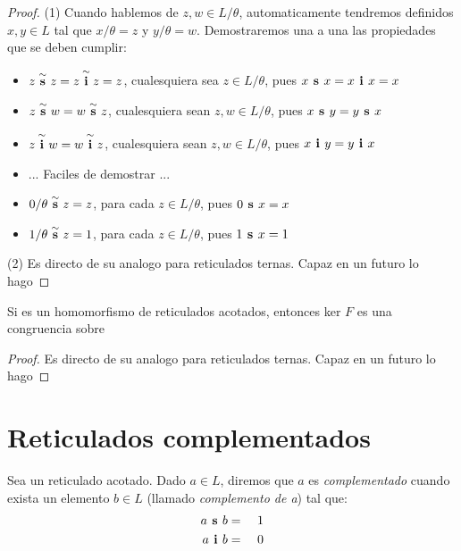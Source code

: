   \begin{proof}
    (1) Cuando hablemos de $z, w \in L/\theta$, automaticamente tendremos definidos $x, y \in L$ tal que $x/\theta = z$ y $y/\theta = w$. Demostraremos una a una las propiedades que se deben cumplir:
    \begin{itemize}
      \item $z\overset{\sim}{\textbf{ s }}z = z\overset{\sim}{\textbf{ i }}z = z$, cualesquiera sea $z \in L/\theta$, pues $x\textbf{ s }x = x\textbf{ i }x = x$
      \item $z\overset{\sim}{\textbf{ s }}w = w\overset{\sim}{\textbf{ s }}z$, cualesquiera sean $z, w \in L/\theta$, pues $x\textbf{ s }y = y\textbf{ s }x$
      \item $z\overset{\sim}{\textbf{ i }}w = w\overset{\sim}{\textbf{ i }}z$, cualesquiera sean $z, w \in L/\theta$, pues $x\textbf{ i }y = y\textbf{ i }x$
      \item ... Faciles de demostrar ...
      \item $0/\theta\overset{\sim}{\textbf{ s }}z = z$, para cada $z \in L/\theta$, pues $0\textbf{ s }x = x$
      \item $1/\theta\overset{\sim}{\textbf{ s }}z = 1$, para cada $z \in L/\theta$, pues $1\textbf{ s }x = 1$
    \end{itemize}

    (2) Es directo de su analogo para reticulados ternas. Capaz en un futuro lo hago
  \end{proof}

  \begin{lemma}
    Si  es un homomorfismo de
    reticulados acotados, entonces ker $F$ es una congruencia sobre \reticulAcot
  \end{lemma}
  \begin{proof}
    Es directo de su analogo para reticulados ternas. Capaz en un futuro lo hago
  \end{proof}

  \section{Reticulados complementados}
  \begin{definition}
    Sea \reticulAcot un reticulado acotado. Dado $a \in L$, diremos que $a$ es \emph{complementado} cuando 
    exista un elemento $b \in L$ (llamado \emph{complemento de a}) tal que:
    \begin{alignat*}{4}
      a\textbf{ s }b &=&\ & 1\\
      a\textbf{ i }b &=&\ & 0
    \end{alignat*}
  \end{definition}

